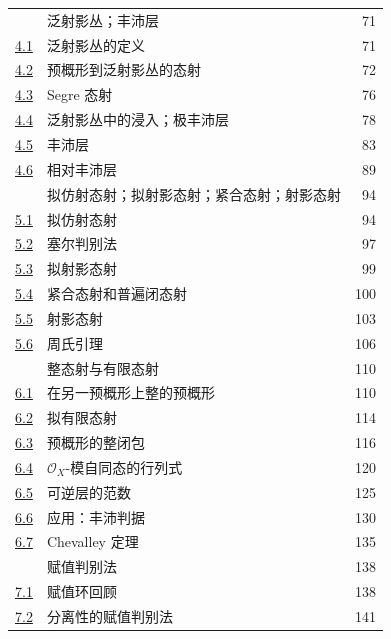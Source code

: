 \documentclass[UTF8,fontset=none,11pt,oneside,openany]{ctexbook}
\begin{document}
\begin{longtable}{@{}p{}p{}r@{}}
\hyperref[section:II.4-zh]{\textsection4} & 泛射影丛；丰沛层 & 71\\
\hyperref[subsection:II.4.1-zh]{4.1} & 泛射影丛的定义 & 71\\
\hyperref[subsection:II.4.2-zh]{4.2} & 预概形到泛射影丛的态射 & 72\\
\hyperref[subsection:II.4.3-zh]{4.3} & Segre 态射 & 76\\
\hyperref[subsection:II.4.4-zh]{4.4} & 泛射影丛中的浸入；极丰沛层 & 78\\
\hyperref[subsection:II.4.5-zh]{4.5} & 丰沛层 & 83\\
\hyperref[II.4.6-zh]{4.6} & 相对丰沛层 & 89\\
\hyperref[section:II.5-zh]{\textsection5} & 拟仿射态射；拟射影态射；紧合态射；射影态射 & 94\\
\hyperref[subsection:II.5.1-zh]{5.1} & 拟仿射态射 & 94\\
\hyperref[subsection:II.5.2-zh]{5.2} & 塞尔判别法 & 97\\
\hyperref[subsection:II.5.3-zh]{5.3} & 拟射影态射 & 99\\
\hyperref[subsection:II.5.4-zh]{5.4} & 紧合态射和普遍闭态射 & 100\\
\hyperref[subsection:II.5.5-zh]{5.5} & 射影态射 & 103\\
\hyperref[subsection:II.5.6-zh]{5.6} & 周氏引理 & 106\\
\hyperref[section:II.6-zh]{\textsection6} & 整态射与有限态射 & 110\\
\hyperref[subsection:II.6.1-zh]{6.1} & 在另一预概形上整的预概形 & 110\\
\hyperref[subsection:II.6.2-zh]{6.2} & 拟有限态射 & 114\\
\hyperref[subsection:II.6.3-zh]{6.3} & 预概形的整闭包 & 116\\
\hyperref[subsection:II.6.4-zh]{6.4} & $\mathcal{O}_X$-模自同态的行列式 & 120\\
\hyperref[subsection:II.6.5-zh]{6.5} & 可逆层的范数 & 125\\
\hyperref[subsection:II.6.6-zh]{6.6} & 应用：丰沛判据 & 130\\
\hyperref[subsection:II.6.7-zh]{6.7} & Chevalley 定理 & 135\\
\hyperref[section:II.7-zh]{\textsection7} & 赋值判别法 & 138\\
\hyperref[subsection:II.7.1-zh]{7.1} & 赋值环回顾 & 138\\
\hyperref[subsection:II.7.2-zh]{7.2} & 分离性的赋值判别法 & 141\\

\end{longtable}
\end{document}
